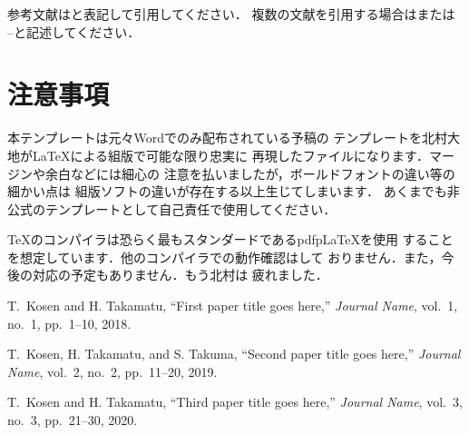 \documentclass[a4j,10pt]{jsarticle}
\begin{document}
参考文献は\cite{sample1}と表記して引用してください．
複数の文献を引用する場合は\cite{sample1,sample2,sample3}または
\cite{sample1}--\cite{sample3}と記述してください．

\section{注意事項}

本テンプレートは元々Wordでのみ配布されている予稿の
テンプレートを北村大地がLaTeXによる組版で可能な限り忠実に
再現したファイルになります．マージンや余白などには細心の
注意を払いましたが，ボールドフォントの違い等の細かい点は
組版ソフトの違いが存在する以上生じてしまいます．
あくまでも非公式のテンプレートとして自己責任で使用してください．

TeXのコンパイラは恐らく最もスタンダードであるpdfpLaTeXを使用
することを想定しています．他のコンパイラでの動作確認はして
おりません．また，今後の対応の予定もありません．もう北村は
疲れました．


\begin{thebibliography}{9}%

  T.~Kosen and H. Takamatu,
  ``First paper title goes here,''
  {\it Journal Name}, vol.~1, no.~1, pp.~1--10, 2018.

  T.~Kosen, H. Takamatu, and S. Takuma, 
  ``Second paper title goes here,''
  {\it Journal Name}, vol.~2, no.~2, pp.~11--20, 2019.

  T.~Kosen and H. Takamatu,
  ``Third paper title goes here,''
  {\it Journal Name}, vol.~3, no.~3, pp.~21--30, 2020.

\end{thebibliography}
\end{document}
